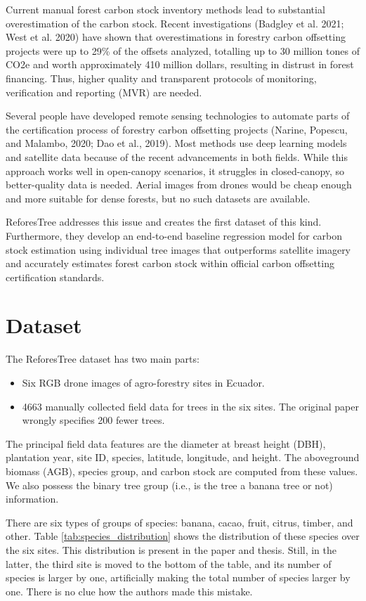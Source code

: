 \documentclass[10pt,twocolumn,letterpaper]{article}
\begin{document}
Current manual forest carbon stock inventory methods lead to substantial overestimation of the carbon stock. Recent investigations (Badgley et al. 2021; West et al. 2020) have shown that overestimations in forestry carbon offsetting projects were up to 29\% of the offsets analyzed, totalling up to 30 million tones of CO2e and worth approximately 410 million dollars, resulting in distrust in forest financing. Thus, higher quality and transparent protocols of monitoring, verification and reporting (MVR) are needed.

Several people have developed remote sensing technologies to automate parts of the certification process of forestry carbon offsetting projects (Narine, Popescu, and Malambo, 2020; Dao et al., 2019). Most methods use deep learning models and satellite data because of the recent advancements in both fields. While this approach works well in open-canopy scenarios, it struggles in closed-canopy, so better-quality data is needed. Aerial images from drones would be cheap enough and more suitable for dense forests, but no such datasets are available.

ReforesTree addresses this issue and creates the first dataset of this kind. Furthermore, they develop an end-to-end baseline regression model for carbon stock estimation using individual tree images that outperforms satellite imagery and accurately estimates forest carbon stock within official carbon offsetting certification standards.

\section{Dataset}

The ReforesTree dataset has two main parts:
\begin{itemize}
    \item Six RGB drone images of agro-forestry sites in Ecuador.
    \item 4663 manually collected field data for trees in the six sites. The original paper wrongly specifies 200 fewer trees.
\end{itemize}

The principal field data features are the diameter at breast height (DBH), plantation year, site ID, species, latitude, longitude, and height. The aboveground biomass (AGB), species group, and carbon stock are computed from these values. We also possess the binary tree group (i.e., is the tree a banana tree or not) information. 

There are six types of groups of species: banana, cacao, fruit, citrus, timber, and other. Table \ref{tab:species_distribution} shows the distribution of these species over the six sites. This distribution is present in the paper and thesis. Still, in the latter, the third site is moved to the bottom of the table, and its number of species is larger by one, artificially making the total number of species larger by one. There is no clue how the authors made this mistake.
\end{document}
